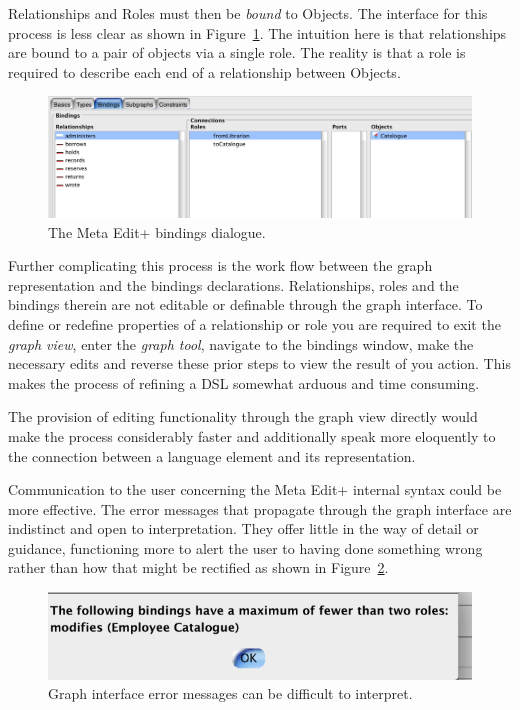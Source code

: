Relationships and Roles must then be \emph{bound} to Objects. The interface for this process is less clear as shown in Figure~\ref{fig:bindings}. The intuition here is that relationships are bound to a pair of objects via a single role. The reality is that a role is required to describe each end of a relationship between Objects. \par

  \begin{figure}[h]
    \centering
    \includegraphics[scale=0.4]{images/bindings.png}
    \caption{The Meta Edit+ bindings dialogue.}
    \label{fig:bindings}
  \end{figure}

Further complicating this process is the work flow between the graph representation and the bindings declarations. Relationships, roles and the bindings therein are not editable or definable through the graph interface. To define or redefine properties of a relationship or role you are required to exit the \emph{graph view}, enter the \emph{graph tool}, navigate to the bindings window, make the necessary edits and reverse these prior steps to view the result of you action. This makes the process of refining a DSL somewhat arduous and time consuming.\par The provision of editing functionality through the graph view directly would make the process considerably faster and additionally speak more eloquently to the connection between a language element and its representation.\par
Communication to the user concerning the Meta Edit+ internal syntax could be more effective.
The error messages that propagate through the graph interface are indistinct and open to interpretation. They offer little in the way of detail or guidance, functioning more to alert the user to having done something wrong rather than how that might be rectified as shown in Figure~\ref{fig:error}. \par

  \begin{figure}[h]
    \centering
    \includegraphics[scale=0.5]{images/entity_error.png}
    \caption{Graph interface error messages can be difficult to interpret.}
    \label{fig:error}
  \end{figure}

